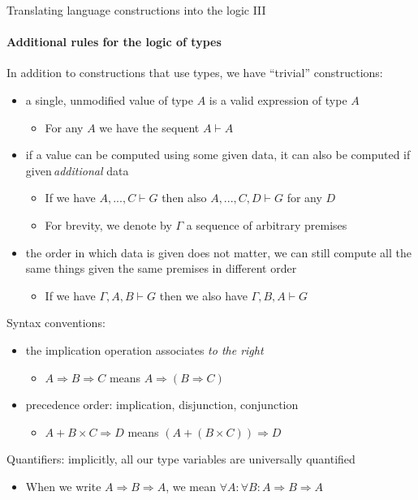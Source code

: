 \documentclass[english]{beamer}
\begin{document}
\begin{frame}{Translating language constructions into the logic III}


\framesubtitle{Additional rules for the logic of types}

In addition to constructions that use types, we have ``trivial''
constructions:
\begin{itemize}
\item a single, unmodified value of type $A$ is a valid expression of type
$A$
\begin{itemize}
\item For any $A$ we have the sequent $A\vdash A$
\end{itemize}
\item if a value can be computed using some given data, it can also be computed
if given\,\emph{additional} data
\begin{itemize}
\item If we have $A,...,C\vdash G$ then also $A,...,C,D\vdash G$ for any
$D$
\item For brevity, we denote by $\Gamma$ a sequence of arbitrary premises
\end{itemize}
\item the order in which data is given does not matter, we can still compute
all the same things given the same premises in different order
\begin{itemize}
\item If we have $\Gamma,A,B\vdash G$ then we also have $\Gamma,B,A\vdash G$
\end{itemize}
\end{itemize}
Syntax conventions:
\begin{itemize}
\item the implication operation associates \emph{to the right}
\begin{itemize}
\item $A\Rightarrow B\Rightarrow C$ means $A\Rightarrow\left(B\Rightarrow C\right)$
\end{itemize}
\item precedence order: implication, disjunction, conjunction
\begin{itemize}
\item $A+B\times C\Rightarrow D$ means $\left(A+\left(B\times C\right)\right)\Rightarrow D$
\end{itemize}
\end{itemize}
Quantifiers: implicitly, all our type variables are universally quantified
\begin{itemize}
\item When we write $A\Rightarrow B\Rightarrow A$, we mean $\forall A:\forall B:A\Rightarrow B\Rightarrow A$
\end{itemize}
\end{frame}
\end{document}

